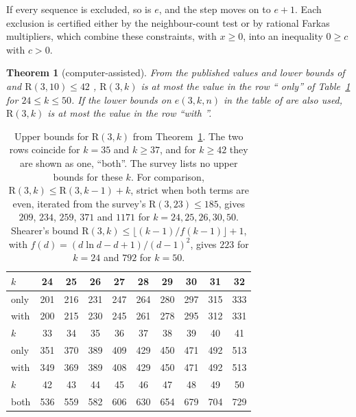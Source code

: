 \documentclass[11pt]{article}
\theoremstyle{spacedplain}
\newtheorem{theorem}{Theorem}[section]
\theoremstyle{spaceddef}
\theoremstyle{spacedremark}
\newcommand{\R}{\mathrm{R}}
\begin{document}
If every sequence is excluded, so is $e$, and the step moves on to $e+1$.
Each exclusion is certified either by the neighbour-count test or by rational Farkas multipliers, which combine these constraints, with $x\ge 0$, into an inequality $0\ge c$ with $c>0$.

\begin{theorem}[computer-assisted]\label{thm:r3k}
From the published values and lower bounds of \cite[Theorem~2 and Tables~3--5]{GR13} and $\R(3,10)\le 42$ \cite[Theorem~6]{GR13}, $\R(3,k)$ is at most the value in the row ``\cite{GR13} only'' of Table~\ref{tab:r3k} for $24\le k\le 50$.
If the lower bounds on $e(3,k,n)$ in the table of \cite[Section~5]{Back3} are also used, $\R(3,k)$ is at most the value in the row ``with \cite{Back3}''.
\end{theorem}

\begin{table}[htbp]
\centering\small
\begin{tabular}{l*{9}{c}}
\toprule
$k$ & 24 & 25 & 26 & 27 & 28 & 29 & 30 & 31 & 32\\
\midrule
\cite{GR13} only & 201 & 216 & 231 & 247 & 264 & 280 & 297 & 315 & 333\\
with \cite{Back3} & 200 & 215 & 230 & 245 & 261 & 278 & 295 & 312 & 331\\
\midrule
$k$ & 33 & 34 & 35 & 36 & 37 & 38 & 39 & 40 & 41\\
\midrule
\cite{GR13} only & 351 & 370 & 389 & 409 & 429 & 450 & 471 & 492 & 513\\
with \cite{Back3} & 349 & 369 & 389 & 408 & 429 & 450 & 471 & 492 & 513\\
\midrule
$k$ & 42 & 43 & 44 & 45 & 46 & 47 & 48 & 49 & 50\\
\midrule
both & 536 & 559 & 582 & 606 & 630 & 654 & 679 & 704 & 729\\
\bottomrule
\end{tabular}
\caption{Upper bounds for $\R(3,k)$ from Theorem~\ref{thm:r3k}.
The two rows coincide for $k=35$ and $k\ge 37$, and for $k\ge 42$ they are shown as one, ``both''.
The survey \cite{Rad26} lists no upper bounds for these $k$.
For comparison, $\R(3,k)\le\R(3,k-1)+k$, strict when both terms are even, iterated from the survey's $\R(3,23)\le 185$, gives $209$, $234$, $259$, $371$ and $1171$ for $k=24,25,26,30,50$.
Shearer's bound \cite{Sh83} $\R(3,k)\le\lfloor(k-1)/f(k-1)\rfloor+1$, with $f(d)=(d\ln d-d+1)/(d-1)^2$, gives $223$ for $k=24$ and $792$ for $k=50$.}
\label{tab:r3k}
\end{table}
\end{document}
